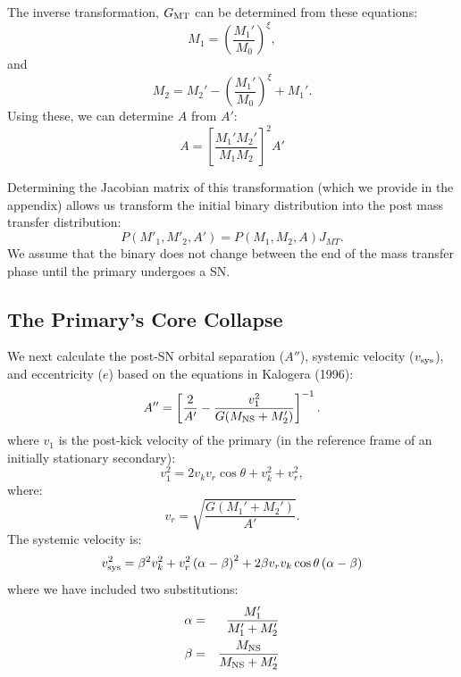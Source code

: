 \documentclass[12pt, preprint]{aastex}
\begin{document}
The inverse transformation, $G_{\rm MT}$ can be determined from these equations:
\begin{equation}
M_1 = \left( \frac{M_1'}{M_0} \right)^{\xi}, 
\end{equation}
and
\begin{equation}
M_2 = M_2' - \left( \frac{M_1'}{M_0} \right)^{\xi} + M_1'.
\end{equation}
Using these, we can determine $A$ from $A'$:
\begin{equation}
A = \left[ \frac{M_1' M_2'}{M_1 M_2} \right]^2 A'
\end{equation}



Determining the Jacobian matrix of this transformation (which we provide in the appendix) allows us transform the initial binary distribution into the post mass transfer distribution:
\begin{equation}
P(M'_1, M'_2, A') = P(M_1, M_2, A) J_{MT}. \label{eq:P_MT}
\end{equation}
We assume that the binary does not change between the end of the mass transfer phase until the primary undergoes a SN. 




\subsection{The Primary's Core Collapse} \label{sec:trans_SN}

We next calculate the post-SN orbital separation ($A''$), systemic velocity ($v_{\rm sys}$), and eccentricity ($e$) based on the equations in Kalogera (1996):
\begin{equation}
A'' = \left[ \frac{2 }{A'}  - \frac{v_1^2}{G(M_{\rm NS} + M_2')} \right]^{-1}. \label{eq:SN_A} \\
\end{equation}
where $v_1$ is the post-kick velocity of the primary (in the reference frame of an initially stationary secondary):
\begin{equation}
v_1^2 = 2v_k v_r \cos \theta + v_k^2 + v_r^2, \label{eq:v_1}
\end{equation}
where:
\begin{equation}
v_r = \sqrt{\frac{G (M_1' + M_2')}{A'}}. \label{eq:v_r}
\end{equation}
The systemic velocity is:
\begin{equation}
v_{\rm sys}^2 = \beta^2 v_k^2
   + v_r^2 \left( \alpha - \beta \right)^2
   + 2 \beta v_r v_k \cos \theta \left( \alpha - \beta \right)
    \label{eq:SN_v_sys}
\end{equation}
where we have included two substitutions:
\begin{eqnarray}
\alpha &=& \frac{M_1'}{M_1' + M_2'} \\
\beta &=& \frac{M_{\rm NS}}{M_{\rm NS} + M_2'}
\end{eqnarray}
\end{document}
